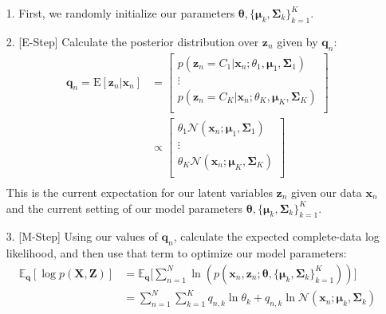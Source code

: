 \begin{itemize}
    \item[1.] First, we randomly initialize our parameters $\boldsymbol{\theta}, \{ \boldsymbol{\mu}_k, \boldsymbol{\Sigma}_k \}_{k=1}^{K}$.
    \item[2.] [E-Step] Calculate the posterior distribution over $\textbf{z}_n$ given by $\textbf{q}_n$:
        \begin{align*}
            \textbf{q}_n = \mathrm{E}[\textbf{z}_n | \textbf{x}_n] &= \begin{bmatrix}
                p(\textbf{z}_n = C_1 | \textbf{x}_n; \theta_1, \boldsymbol{\mu}_1, \boldsymbol{\Sigma}_1) \\
                \vdots \\
                p(\textbf{z}_n = C_K | \textbf{x}_n; \theta_K, \boldsymbol{\mu}_K, \boldsymbol{\Sigma}_K) \\
            \end{bmatrix} \\
            &\propto \begin{bmatrix}
                \theta_1 \mathcal{N}(\textbf{x}_n; \boldsymbol{\mu}_1, \boldsymbol{\Sigma}_1) \\
                \vdots \\
                \theta_K \mathcal{N}(\textbf{x}_n; \boldsymbol{\mu}_K, \boldsymbol{\Sigma}_K) \\
            \end{bmatrix} \\
        \end{align*}
        This is the current expectation for our latent variables $\textbf{z}_n$ given our data $\textbf{x}_n$ and the current setting of our model parameters $\boldsymbol{\theta}, \{ \boldsymbol{\mu}_k, \boldsymbol{\Sigma}_k \}_{k=1}^{K}$.
    \item[3.] [M-Step] Using our values of $\textbf{q}_n$, calculate the expected complete-data log likelihood, and then use that term to optimize our model parameters:
        \begin{align*}
            \mathbb{E}_{\textbf{q}}[\log p(\textbf{X}, \textbf{Z})] &= \mathbb{E}_{\textbf{q}} \bigg[ \sum_{n=1}^{N} \ln(p(\textbf{x}_n, \textbf{z}_n; \boldsymbol{\theta}, \{ \boldsymbol{\mu}_k, \boldsymbol{\Sigma}_k \}_{k=1}^{K})) \bigg] \\
            &= \sum_{n=1}^{N} \sum_{k=1}^{K} q_{n, k} \ln \theta_k + q_{n, k} \ln \mathcal{N}(\textbf{x}_n; \boldsymbol{\mu}_k, \boldsymbol{\Sigma}_k) \\

\end{align*}
\end{itemize}
